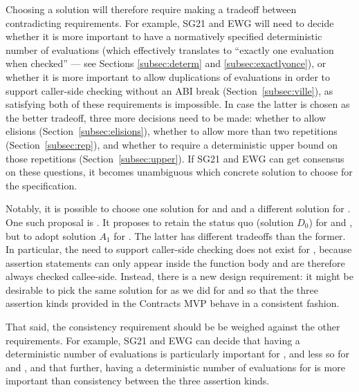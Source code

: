 Choosing a solution will therefore require making a tradeoff between  contradicting requirements. For example, SG21 and EWG will need to decide  whether it is more important to have a normatively specified deterministic number of evaluations (which effectively translates to ``exactly one evaluation when checked'' --- see Sections \ref{subsec:determ} and \ref{subsec:exactlyonce}), or whether it is more important to allow duplications of evaluations in order to support caller-side checking without an ABI break (Section~\ref{subsec:ville}), as satisfying both of these requirements is impossible. In case the latter is chosen as the better tradeoff, three more decisions need to be made: whether to allow elisions (Section~\ref{subsec:elisions}), whether to allow more than two repetitions (Section~\ref{subsec:rep}), and whether to require a deterministic upper bound on those repetitions (Section~\ref{subsec:upper}). If SG21 and EWG can get consensus on these questions, it becomes unambiguous which concrete solution to choose for the specification.

Notably, it is possible to choose one solution for  and  and a different solution for \mbox{}. One such proposal is \cite{P3257R0}. It proposes to retain the status quo (solution $D_0$) for  and , but to adopt solution $A_1$ for . The latter has different tradeoffs than the former. In particular, the need to support caller-side checking does not exist for , because assertion statements can only appear inside the function body and are therefore always checked callee-side. Instead, there is a new design requirement: it might be desirable to pick the same solution for  as we did for  and  so that the three assertion kinds provided in the Contracts MVP behave in a consistent fashion.

That said, the consistency requirement should be be weighed against the other requirements. For example, SG21 and EWG can decide that having a deterministic number of evaluations is particularly important for , and less so for  and , and that further, having a deterministic number of evaluations for  is more important than consistency between the three assertion kinds.

